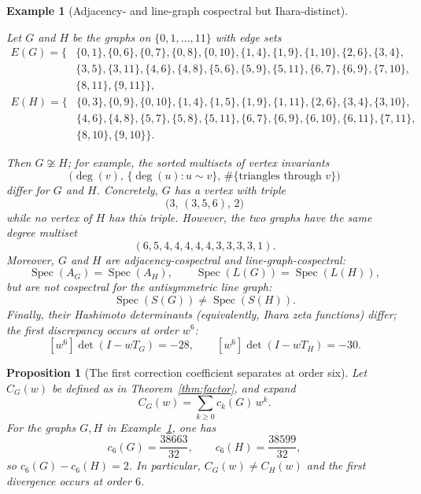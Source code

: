 \documentclass[11pt]{article}
\newtheorem{proposition}{Proposition}
\newtheorem{example}{Example}
\begin{document}
\begin{example}[Adjacency- and line-graph cospectral but Ihara-distinct]\label{ex:holygrail}

Let \(G\) and \(H\) be the graphs on \(\{0,1,\dots,11\}\) with edge sets
\[
\begin{aligned}
E(G)=\{&
\{0,1\},\{0,6\},\{0,7\},\{0,8\},\{0,10\},\{1,4\},\{1,9\},\{1,10\},\{2,6\},\{3,4\},\\
&\{3,5\},\{3,11\},\{4,6\},\{4,8\},\{5,6\},\{5,9\},\{5,11\},\{6,7\},\{6,9\},\{7,10\},\\
&\{8,11\},\{9,11\}\},
\end{aligned}
\]
\[
\begin{aligned}
E(H)=\{&
\{0,3\},\{0,9\},\{0,10\},\{1,4\},\{1,5\},\{1,9\},\{1,11\},\{2,6\},\{3,4\},\{3,10\},\\
&\{4,6\},\{4,8\},\{5,7\},\{5,8\},\{5,11\},\{6,7\},\{6,9\},\{6,10\},\{6,11\},\{7,11\},\\
&\{8,10\},\{9,10\}\}.
\end{aligned}
\]

Then $G\not\cong H$; for example, the sorted multisets of vertex invariants
\[
\bigl(\deg(v),\,\{\deg(u):u\sim v\},\,\#\{\text{triangles through }v\}\bigr)
\]
differ for $G$ and $H$. Concretely, $G$ has a vertex with triple
\[
\bigl(3,\,(3,5,6),\,2\bigr)
\]
while no vertex of $H$ has this triple. However, the two graphs have the same degree multiset
\[
(6,5,4,4,4,4,4,3,3,3,3,1).
\]
Moreover, $G$ and $H$ are adjacency-cospectral and line-graph-cospectral:
\[
\operatorname{Spec}(A_G)=\operatorname{Spec}(A_H),
\qquad
\operatorname{Spec}(L(G))=\operatorname{Spec}(L(H)),
\]
but are not cospectral for the antisymmetric line graph:
\[
\operatorname{Spec}(S(G))\neq\operatorname{Spec}(S(H)).
\]
Finally, their Hashimoto determinants (equivalently, Ihara zeta functions) differ; the first discrepancy occurs at order $w^6$:
\[
[w^6]\det(I-wT_G)=-28,
\qquad
[w^6]\det(I-wT_H)=-30.
\]
\end{example}

\begin{proposition}[The first correction coefficient separates at order six]\label{prop:c6}
Let $C_G(w)$ be defined as in Theorem~\ref{thm:factor}, and expand
\[
C_G(w)=\sum_{k\ge0}c_k(G)\,w^k.
\]
For the graphs $G,H$ in Example~\ref{ex:holygrail}, one has
\[
c_6(G)=\frac{38663}{32},
\qquad
c_6(H)=\frac{38599}{32},
\]
so $c_6(G)-c_6(H)=2$. In particular, $C_G(w)\neq C_H(w)$ and the first divergence occurs at order $6$.
\end{proposition}
\end{document}
